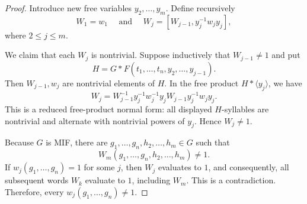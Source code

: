 \documentclass[10pt,a4paper]{amsart}
\begin{document}
\begin{proof}
Introduce new free variables $y_2,\ldots,y_m$. Define recursively
$$
W_1=w_1\quad\text{ and }\quad W_j=[W_{j-1},y_j^{-1}w_jy_j],
$$
where $2\leq j\leq m$.

We claim that each $W_j$ is nontrivial. Suppose inductively that
$W_{j-1}\neq1$ and put
$$
H=G*F(t_1,\ldots,t_n,y_2,\ldots,y_{j-1}).
$$
Then $W_{j-1},w_j$ are nontrivial elements of $H$. In the free product $H*\langle y_j\rangle$, we have
$$
W_j
=
W_{j-1}^{-1}y_j^{-1}w_j^{-1}y_j
W_{j-1}y_j^{-1}w_jy_j.
$$
This is a reduced free-product normal form: all displayed $H$-syllables are
nontrivial and alternate with nontrivial powers of $y_j$. Hence
$W_j\neq1$.

Because $G$ is MIF, there are $g_1,\ldots,g_n,h_2,\ldots,h_m\in G$ such that
$$
W_m(g_1,\ldots,g_n,h_2,\ldots,h_m)\neq1.
$$
If $w_j(g_1,\ldots,g_n)=1$ for some $j$, then $W_j$ evaluates to $1$, and consequently, all subsequent words $W_k$ evaluate to $1$, including $W_m$. This is a contradiction. Therefore, every $w_j(g_1,\ldots,g_n)\neq1$.
\end{proof}
\end{document}

